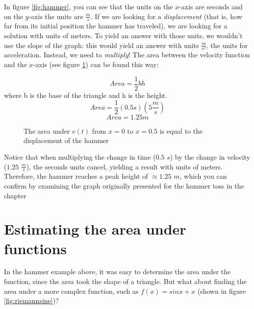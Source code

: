 In figure \ref{fig:hammer}, you can see that the units on the $x$-axis are seconds and on the $y$-axis the units are $\frac{m}{s}$. If we are looking for a \textit{displacement} (that is, how far from its initial position the hammer has traveled), we are looking for a solution with units of meters. To yield an answer with those units, we wouldn't use the slope of the graph: this would yield an answer with units $\frac{m}{s^s}$, the units for acceleration. Instead, we need to \textit{multiply}! The area between the velocity function and the $x$-axis (see figure \ref{fig:hammerarea}) can be found this way:

$$Area=\frac{1}{2}bh$$where b is the base of the triangle and h is the height. 
$$Area=\frac{1}{2}(0.5s)(5\frac{m}{s})$$
$$Area=1.25m$$


\begin{figure}[htbp]
	\centering
	\caption{The area under $v(t)$ from $x=0$ to $x=0.5$ is equal to the displacement of the hammer}
	\label{fig:hammerarea}
\end{figure}

Notice that when multiplying the change in time ($0.5$ $s$) by the change in velocity ($1.25$ $\frac{m}{s}$), the seconds units cancel, yielding a result with units of meters. Therefore, the hammer reaches a peak height of $\approx1.25$ $m$, which you can confirm by examining the graph originally presented for the hammer toss in the chapter %



\section{Estimating the area under functions}

In the hammer example above, it was easy to determine the area under the function, since the area took the shape of a triangle. But what about finding the area under a more complex function, such as $f(x) = sin{x}+x$ (shown in figure \ref{fig:riemannsine})?

